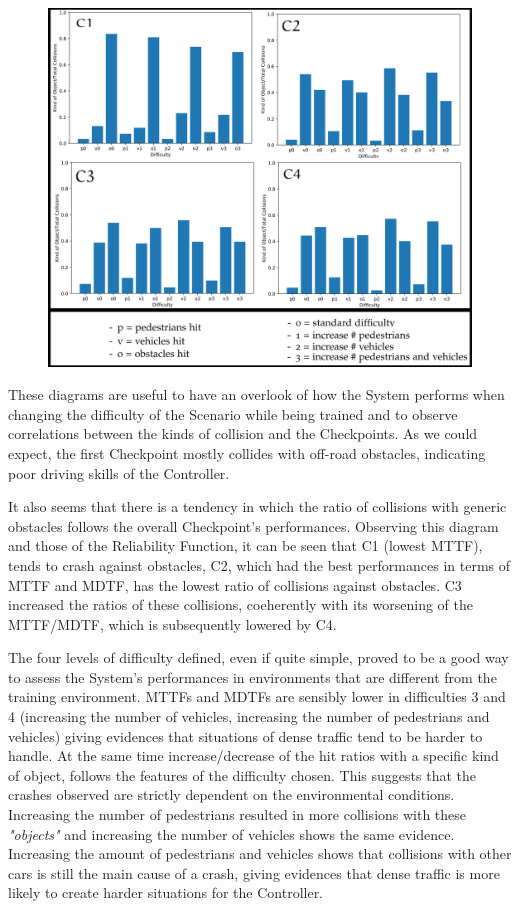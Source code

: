 \begin{figure}[h!]
	\includegraphics[width=\textwidth]{img/hit-ratios.png}
	\caption{}
\end{figure}

These diagrams are useful to have an overlook of how the System performs when changing the difficulty of the Scenario while being trained and to observe correlations between the kinds of collision and the Checkpoints.
As we could expect, the first Checkpoint mostly collides with off-road obstacles, indicating poor driving skills of the Controller.

It also seems that there is a tendency in which the ratio of collisions with generic obstacles follows the overall Checkpoint's performances.
Observing this diagram and those of the Reliability Function, it can be seen that C1 (lowest MTTF), tends to crash against obstacles, C2, which had the best performances in terms of MTTF and MDTF, has the lowest ratio of collisions against obstacles. C3 increased the ratios of these collisions, coeherently with its worsening of the MTTF/MDTF, which is subsequently lowered by C4.\newline

The four levels of difficulty defined, even if quite simple, proved to be a good way to assess the System's performances in environments that are different from the training environment. MTTFs and MDTFs are sensibly lower in difficulties 3 and 4 (increasing the number of vehicles, increasing the number of pedestrians and vehicles) giving evidences that situations of dense traffic tend to be harder to handle. At the same time increase/decrease of the hit ratios with a specific kind of object, follows the features of the difficulty chosen. This suggests that the crashes observed are strictly dependent on the environmental conditions. Increasing the number of pedestrians resulted in more collisions with these \textsl{"objects"} and increasing the number of vehicles shows the same evidence. Increasing the amount of pedestrians and vehicles shows that collisions with other cars is still the main cause of a crash, giving evidences that dense traffic is more likely to create harder situations for the Controller.

